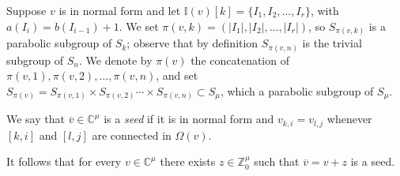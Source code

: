 \documentclass[11pt,fleqn]{amsart}
\newcounter{para}[section]
\newcommand\CC{\mathbb C}
\newcommand\ZZ{\mathbb Z}
\newcommand\vv{\overline{v}}
\newcommand\II{\mathbb I}
\newcommand\abs[1]{|#1|}
\begin{document}
Suppose $v$ is in normal form and let $\II(v)[k] = \{I_1, I_2, \ldots, I_r\}$, 
with $a(I_i) = b(I_{i-1}) + 1$. We set $\pi(v,k) = (\abs{I_1},\abs{I_2}, 
\ldots, \abs{I_r})$, so $S_{\pi(v,k)}$ is a parabolic subgroup of $S_k$; 
observe that by definition $S_{\pi(v,n)}$ is the trivial subgroup of $S_n$. 
We denote by $\pi(v)$ the concatenation of $\pi(v,1), \pi(v,2), \ldots,
\pi(v,n)$, and set $S_{\pi(v)} = S_{\pi(v,1)} \times S_{\pi(v,2)} \cdots 
\times S_{\pi(v,n)} \subset S_\mu$, which a parabolic subgroup of $S_\mu$.
\begin{Definition}
We say that $\vv \in \CC^\mu$ is a \emph{seed} if it is in normal form and 
$v_{k,i} = v_{l,j}$ whenever $[k,i]$ and $[l,j]$ are connected in $\Omega(v)$.
\end{Definition}
It follows that for every $v \in \CC^\mu$ there exists $z \in \ZZ^\mu_0$ such
that $\vv = v + z$ is a seed.
\end{document}
